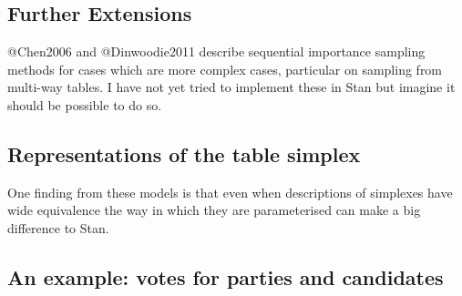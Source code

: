 \documentclass[
  letterpaper,
  DIV=11,
  numbers=noendperiod]{scrartcl}
\newenvironment{Shaded}{\begin{snugshade}}{\end{snugshade}}
\newcommand{\ControlFlowTok}[1]{\textcolor[rgb]{0.00,0.23,0.31}{\textbf{#1}}}
\newcommand{\DecValTok}[1]{\textcolor[rgb]{0.68,0.00,0.00}{#1}}
\newcommand{\FunctionTok}[1]{\textcolor[rgb]{0.28,0.35,0.67}{#1}}
\newcommand{\NormalTok}[1]{\textcolor[rgb]{0.00,0.23,0.31}{#1}}
\newcommand{\OtherTok}[1]{\textcolor[rgb]{0.00,0.23,0.31}{#1}}
\newcommand{\SpecialCharTok}[1]{\textcolor[rgb]{0.37,0.37,0.37}{#1}}
\newcommand{\StringTok}[1]{\textcolor[rgb]{0.13,0.47,0.30}{#1}}
\begin{document}
\subsection{Further Extensions}\label{further-extensions}

@Chen2006 and @Dinwoodie2011 describe sequential importance sampling
methods for cases which are more complex cases, particular on sampling
from multi-way tables. I have not yet tried to implement these in Stan
but imagine it should be possible to do so.

\subsection{Representations of the table
simplex}\label{representations-of-the-table-simplex}

One finding from these models is that even when descriptions of
simplexes have wide equivalence the way in which they are parameterised
can make a big difference to Stan.

\subsection{An example: votes for parties and
candidates}\label{an-example-votes-for-parties-and-candidates}

\begin{Shaded}
\end{Shaded}
\end{document}
